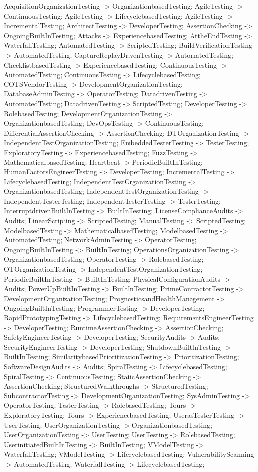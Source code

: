 \documentclass{article}
\begin{document}
{AcquisitionOrganizationTesting -> OrganizationbasedTesting;
AgileTesting -> ContinuousTesting;
AgileTesting -> LifecyclebasedTesting;
AgileTesting -> IncrementalTesting;
ArchitectTesting -> DeveloperTesting;
AssertionChecking -> OngoingBuiltInTesting;
Attacks -> ExperiencebasedTesting;
AttheEndTesting -> WaterfallTesting;
AutomatedTesting -> ScriptedTesting;
BuildVerificationTesting -> AutomatedTesting;
CaptureReplayDrivenTesting -> AutomatedTesting;
ChecklistbasedTesting -> ExperiencebasedTesting;
ContinuousTesting -> AutomatedTesting;
ContinuousTesting -> LifecyclebasedTesting;
COTSVendorTesting -> DevelopmentOrganizationTesting;
DatabaseAdminTesting -> OperatorTesting;
DatadrivenTesting -> AutomatedTesting;
DatadrivenTesting -> ScriptedTesting;
DeveloperTesting -> RolebasedTesting;
DevelopmentOrganizationTesting -> OrganizationbasedTesting;
DevOpsTesting -> ContinuousTesting;
DifferentialAssertionChecking -> AssertionChecking;
DTOrganizationTesting -> IndependentTestOrganizationTesting;
EmbeddedTesterTesting -> TesterTesting;
ExploratoryTesting -> ExperiencebasedTesting;
FuzzTesting -> MathematicalbasedTesting;
Heartbeat -> PeriodicBuiltInTesting;
HumanFactorsEngineerTesting -> DeveloperTesting;
IncrementalTesting -> LifecyclebasedTesting;
IndependentTestOrganizationTesting -> OrganizationbasedTesting;
IndependentTestOrganizationTesting -> IndependentTesterTesting;
IndependentTesterTesting -> TesterTesting;
InterruptdrivenBuiltInTesting -> BuiltInTesting;
LicenseComplianceAudits -> Audits;
LinearScripting -> ScriptedTesting;
ManualTesting -> ScriptedTesting;
ModelbasedTesting -> MathematicalbasedTesting;
ModelbasedTesting -> AutomatedTesting;
NetworkAdminTesting -> OperatorTesting;
OngoingBuiltInTesting -> BuiltInTesting;
OperationsOrganizationTesting -> OrganizationbasedTesting;
OperatorTesting -> RolebasedTesting;
OTOrganizationTesting -> IndependentTestOrganizationTesting;
PeriodicBuiltInTesting -> BuiltInTesting;
PhysicalConfigurationAudits -> Audits;
PowerUpBuiltInTesting -> BuiltInTesting;
PrimeContractorTesting -> DevelopmentOrganizationTesting;
PrognosticsandHealthManagement -> OngoingBuiltInTesting;
ProgrammerTesting -> DeveloperTesting;
RapidPrototypingTesting -> LifecyclebasedTesting;
RequirementsEngineerTesting -> DeveloperTesting;
RuntimeAssertionChecking -> AssertionChecking;
SafetyEngineerTesting -> DeveloperTesting;
SecurityAudits -> Audits;
SecurityEngineerTesting -> DeveloperTesting;
ShutdownBuiltInTesting -> BuiltInTesting;
SimilaritybasedPrioritizationTesting -> PrioritizationTesting;
SoftwareDesignAudits -> Audits;
SpiralTesting -> LifecyclebasedTesting;
SpiralTesting -> ContinuousTesting;
StaticAssertionChecking -> AssertionChecking;
StructuredWalkthroughs -> StructuredTesting;
SubcontractorTesting -> DevelopmentOrganizationTesting;
SysAdminTesting -> OperatorTesting;
TesterTesting -> RolebasedTesting;
Tours -> ExploratoryTesting;
Tours -> ExperiencebasedTesting;
UserasTesterTesting -> UserTesting;
UserOrganizationTesting -> OrganizationbasedTesting;
UserOrganizationTesting -> UserTesting;
UserTesting -> RolebasedTesting;
UserinitiatedBuiltInTesting -> BuiltInTesting;
VModelTesting -> WaterfallTesting;
VModelTesting -> LifecyclebasedTesting;
VulnerabilityScanning -> AutomatedTesting;
WaterfallTesting -> LifecyclebasedTesting;

}
\end{document}
